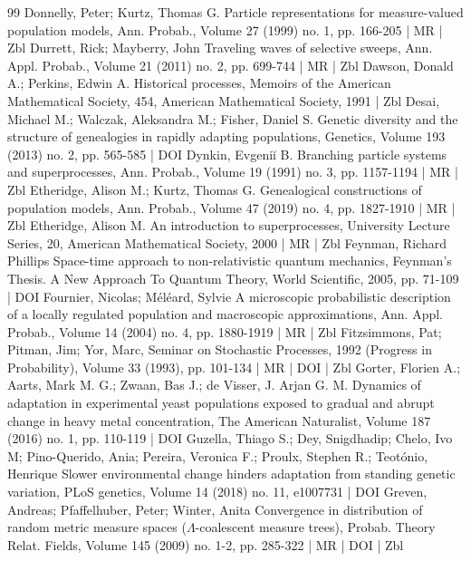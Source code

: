 \begin{thebibliography}{99}
Donnelly, Peter; Kurtz, Thomas G. Particle representations for measure-valued population models, Ann. Probab., Volume 27 (1999) no. 1, pp. 166-205 | MR | Zbl
Durrett, Rick; Mayberry, John Traveling waves of selective sweeps, Ann. Appl. Probab., Volume 21 (2011) no. 2, pp. 699-744 | MR | Zbl
Dawson, Donald A.; Perkins, Edwin A. Historical processes, Memoirs of the American Mathematical Society, 454, American Mathematical Society, 1991 | Zbl
Desai, Michael M.; Walczak, Aleksandra M.; Fisher, Daniel S. Genetic diversity and the structure of genealogies in rapidly adapting populations, Genetics, Volume 193 (2013) no. 2, pp. 565-585 | DOI
Dynkin, Evgeniĭ B. Branching particle systems and superprocesses, Ann. Probab., Volume 19 (1991) no. 3, pp. 1157-1194 | MR | Zbl
Etheridge, Alison M.; Kurtz, Thomas G. Genealogical constructions of population models, Ann. Probab., Volume 47 (2019) no. 4, pp. 1827-1910 | MR | Zbl
Etheridge, Alison M. An introduction to superprocesses, University Lecture Series, 20, American Mathematical Society, 2000 | MR | Zbl
Feynman, Richard Phillips Space-time approach to non-relativistic quantum mechanics, Feynman’s Thesis. A New Approach To Quantum Theory, World Scientific, 2005, pp. 71-109 | DOI
Fournier, Nicolas; Méléard, Sylvie A microscopic probabilistic description of a locally regulated population and macroscopic approximations, Ann. Appl. Probab., Volume 14 (2004) no. 4, pp. 1880-1919 | MR | Zbl
Fitzsimmons, Pat; Pitman, Jim; Yor, Marc, Seminar on Stochastic Processes, 1992 (Progress in Probability), Volume 33 (1993), pp. 101-134 | MR | DOI | Zbl
Gorter, Florien A.; Aarts, Mark M. G.; Zwaan, Bas J.; de Visser, J. Arjan G. M. Dynamics of adaptation in experimental yeast populations exposed to gradual and abrupt change in heavy metal concentration, The American Naturalist, Volume 187 (2016) no. 1, pp. 110-119 | DOI
Guzella, Thiago S.; Dey, Snigdhadip; Chelo, Ivo M; Pino-Querido, Ania; Pereira, Veronica F.; Proulx, Stephen R.; Teotónio, Henrique Slower environmental change hinders adaptation from standing genetic variation, PLoS genetics, Volume 14 (2018) no. 11, e1007731 | DOI
Greven, Andreas; Pfaffelhuber, Peter; Winter, Anita Convergence in distribution of random metric measure spaces ($\Lambda $-coalescent measure trees), Probab. Theory Relat. Fields, Volume 145 (2009) no. 1-2, pp. 285-322 | MR | DOI | Zbl

\end{thebibliography}
